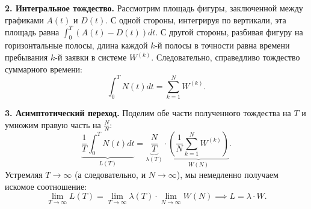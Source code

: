 \begin{tproof}
\begin{center}
\end{center}

\textbf{2. Интегральное тождество.}
Рассмотрим площадь фигуры, заключенной между графиками $A(t)$ и $D(t)$. С одной стороны, интегрируя по вертикали, эта площадь равна $\int_{0}^{T} (A(t) - D(t)) dt$. С другой стороны, разбивая фигуру на горизонтальные полосы, длина каждой $k$-й полосы в точности равна времени пребывания $k$-й заявки в системе $W^{(k)}$. Следовательно, справедливо тождество суммарного времени:
$$ \int_{0}^{T} N(t) dt = \sum_{k=1}^{N} W^{(k)}. $$

\textbf{3. Асимптотический переход.}
Поделим обе части полученного тождества на $T$ и умножим правую часть на $\frac{N}{N}$:
$$ \underbrace{\frac{1}{T} \int_{0}^{T} N(t) dt}_{L(T)} = \underbrace{\frac{N}{T}}_{\lambda(T)} \cdot \underbrace{\left( \frac{1}{N} \sum_{k=1}^{N} W^{(k)} \right)}_{W(N)}. $$
Устремляя $T \to \infty$ (а следовательно, и $N \to \infty$), мы немедленно получаем искомое соотношение:
$$ \lim_{T \to \infty} L(T) = \lim_{T \to \infty} \lambda(T) \cdot \lim_{N \to \infty} W(N) \implies L = \lambda \cdot W. $$


\end{tproof}
